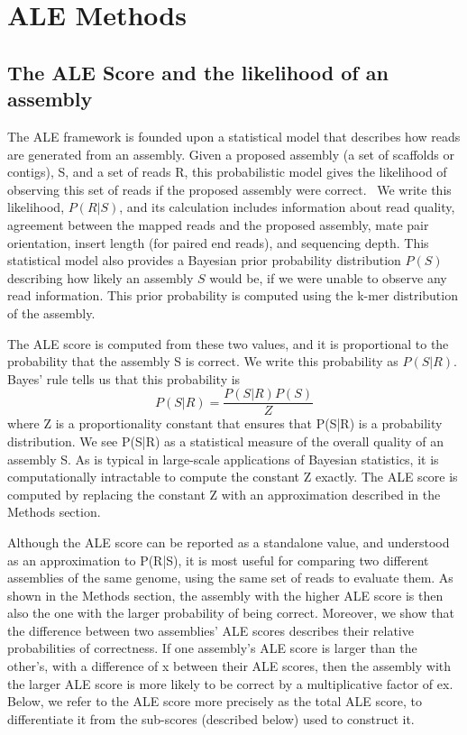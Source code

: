 \documentclass[phd,tocprelim]{cornell}
\begin{document}

\chapter{ALE Methods} %
\label{cha:ALE Methods}

\section{The ALE Score and the likelihood of an assembly} %
\label{sec:The ALE Score and the likelihood of an assembly}

The ALE framework is founded upon a statistical model that describes how reads are generated from an assembly.  Given a proposed assembly (a set of scaffolds or contigs), S, and a set of reads R, this probabilistic model gives the likelihood of observing this set of reads if the proposed assembly were correct.  We write this likelihood, $P(R|S)$, and its calculation includes information about read quality, agreement between the mapped reads and the proposed assembly, mate pair orientation, insert length (for paired end reads), and sequencing depth.  This statistical model also provides a Bayesian prior probability distribution $P(S)$ describing how likely an assembly $S$ would be, if we were unable to observe any read information.   This prior probability is computed using the k-mer distribution of the assembly.

The ALE score is computed from these two values, and it is proportional to the probability that the assembly S is correct.  We write this probability as $P(S|R)$.  Bayes’ rule tells us that this probability is
\begin{equation}
    P\left(S|R\right) = \frac{P\left(S|R\right)P(S)}{Z}
\end{equation}
where Z is a proportionality constant that ensures that P(S|R) is a probability distribution.  We see P(S|R) as a statistical measure of the overall quality of an assembly S.  As is typical in large-scale applications of Bayesian statistics, it is computationally intractable to compute the constant Z exactly.  The ALE score is computed by replacing the constant Z with an approximation described in the Methods section.

Although the ALE score can be reported as a standalone value, and understood as an approximation to P(R|S), it is most useful for comparing two different assemblies of the same genome, using the same set of reads to evaluate them.  As shown in the Methods section, the assembly with the higher ALE score is then also the one with the larger probability of being correct.  Moreover, we show that the difference between two assemblies’ ALE scores describes their relative probabilities of correctness.  If one assembly’s ALE score is larger than the other’s, with a difference of x between their ALE scores, then the assembly with the larger ALE score is more likely to be correct by a multiplicative factor of ex.  Below, we refer to the ALE score more precisely as the total ALE score, to differentiate it from the sub-scores (described below) used to construct it.
\end{document}

